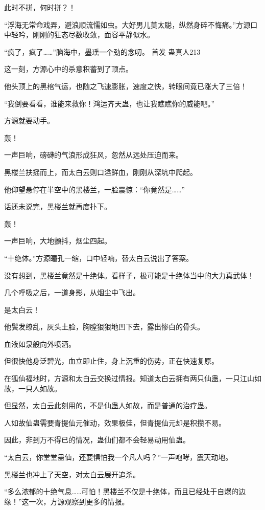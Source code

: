 \begin{this_body}
此时不拼，何时拼？！

“浮海无常命戏弄，避浪顺流懦如虫。大好男儿莫太聪，纵然身碎不悔痛。”方源口中轻吟，刚刚的狂态尽数收敛，面容平静似水。

“疯了，疯了……”脑海中，墨瑶一个劲的念叨。  首发 蛊真人213

这一刻，方源心中的杀意积蓄到了顶点。

他头顶上的黑棺气运，也随之飞速膨胀，速度之快，转眼间竟已涨大了三倍！

“我倒要看看，谁能来救你！鸿运齐天蛊，也让我瞧瞧你的威能吧。”

方源就要动手。

轰！

一声巨响，磅礴的气浪形成狂风，忽然从远处压迫而来。

黑楼兰扶摇而上，而太白云则口溢鲜血，刚刚从深坑中爬起。

他仰望悬停在半空中的黑楼兰，一脸震惊：“你竟然是……”

话还未说完，黑楼兰就再度扑下。

轰！

一声巨响，大地颤抖，烟尘四起。

“十绝体。”方源瞳孔一缩，口中轻喃，替太白云说出了答案。

没有想到，黑楼兰竟然是十绝体。看样子，极可能是十绝体当中的大力真武体！

几个呼吸之后，一道身影，从烟尘中飞出。

是太白云！

他鬓发缭乱，灰头土脸，胸膛狠狠地凹下去，露出惨白的骨头。

血液如泉般向外喷洒。

但很快他身泛碧光，血立即止住，身上沉重的伤势，正在快速复原。

在狐仙福地时，方源和太白云交换过情报。知道太白云拥有两只仙蛊，一只江山如故，一只人如故。

但显然，太白云此刻用的，不是仙蛊人如故，而是普通的治疗蛊。

人如故仙蛊需要青提仙元催动，效果极佳，但青提仙元却是积攒不易。

因此，非到万不得已的情况，蛊仙们都不会轻易动用仙蛊。

“太白云，你堂堂蛊仙，还要惧怕我一个凡人吗？”一声咆哮，震天动地。

黑楼兰也冲上了天空，对太白云展开追杀。

“多么浓郁的十绝气息……可怕！黑楼兰不仅是十绝体，而且已经处于自爆的边缘！”这一次，方源观察到更多的情报。


\end{this_body}
